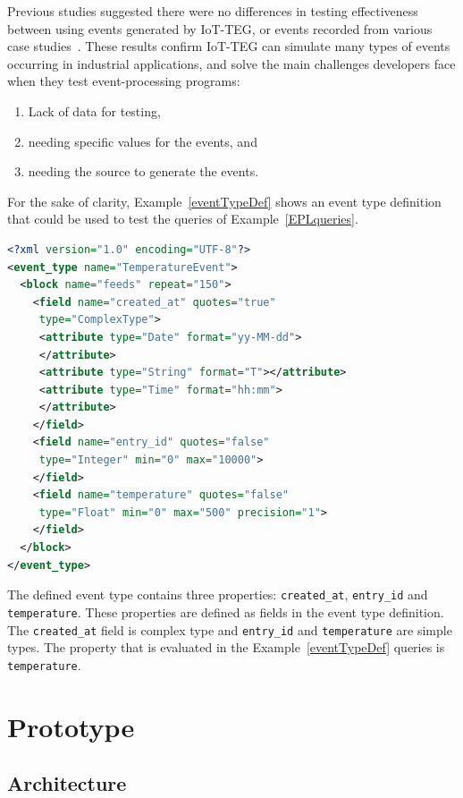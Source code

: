\documentclass[conference]{IEEEtran}
\theoremstyle{definition}
\begin{document}
Previous studies suggested there were no differences in testing effectiveness between using events
generated by IoT-TEG, or events recorded from various case studies~\cite{Gutierrez2017}. These
results confirm IoT-TEG can simulate many types of events occurring in industrial applications,
and solve the main challenges developers face when they test event-processing programs:
\begin{enumerate}
 \item Lack of data for testing,
 \item needing specific values for the events, and
 \item needing the source to generate the events.
\end{enumerate}

For the sake of clarity, Example~\ref{eventTypeDef} shows an event type
definition that could be used to test the queries of Example~\ref{EPLqueries}.

\begin{lstlisting}[basicstyle=\ttfamily\footnotesize,language=XML,caption=Event type definition example,label=eventTypeDef]
<?xml version="1.0" encoding="UTF-8"?>
<event_type name="TemperatureEvent">
  <block name="feeds" repeat="150">
    <field name="created_at" quotes="true" 
     type="ComplexType">
     <attribute type="Date" format="yy-MM-dd">
     </attribute>
     <attribute type="String" format="T"></attribute>
     <attribute type="Time" format="hh:mm">
     </attribute>
    </field>
    <field name="entry_id" quotes="false" 
     type="Integer" min="0" max="10000">
    </field>
    <field name="temperature" quotes="false" 
     type="Float" min="0" max="500" precision="1">
    </field>
  </block>
</event_type>
\end{lstlisting}

The defined event type contains three properties: \texttt{created\_at},
\texttt{entry\_id} and \texttt{temperature}. These properties are defined as
fields in the event type definition. The \texttt{created\_at} field is complex
type and \texttt{entry\_id} and \texttt{temperature} are simple types. The
property that is evaluated in the Example~\ref{eventTypeDef} queries is
\texttt{temperature}.

\section{Prototype}
\label{sec:basicprototype}

\subsection{Architecture}
\label{sub:basicprototypearchitecture}
\end{document}
